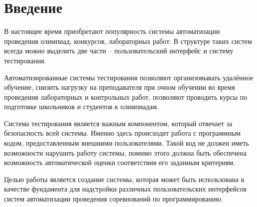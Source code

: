 \chapter*{Введение}
В настоящее время приобретают популярность системы автоматизации проведения
олимпиад, конкурсов, лабораторных работ. В структуре таких систем всегда
можно выделить две части -- пользовательский интерфейс и систему тестирования.

Автоматизированные системы тестирования позволяют организовывать удалённое обучение,
снизить нагрузку на преподавателя при очном обучении во время
проведения лабораторных и контрольных работ,
позволяют проводить курсы по подготовке школьников и студентов к олимпиадам.

Система тестирования является важным компонентом,
который отвечает за безопасность всей системы. Именно здесь
происходит работа с программным кодом, предоставленным внешними
пользователями. Такой код не должен иметь возможности
нарушить работу системы, помимо этого должна быть обеспечена
возможность автоматической оценки соответствия его заданным
критериям.

Целью работы является создание системы,
которая может быть использована в качестве фундамента
для надстройки различных пользовательских интерфейсов
систем автоматизации проведения соревнований по программированию.

